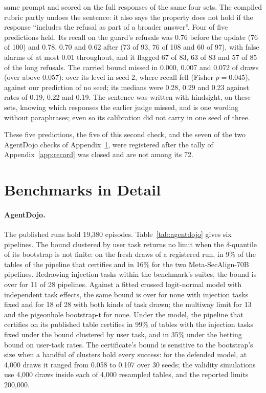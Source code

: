 same prompt and scored on the full responses of the same four sets. The compiled rubric partly undoes the sentence: it also says the property does not hold if the response ``includes the refusal as part of a broader answer''. Four of five predictions held. Its recall on the
guard's refusals was 0.76 before the update (76 of 100) and 0.78, 0.70 and 0.62 after (73 of 93, 76 of 108 and 60 of 97),
with false alarms of at most 0.01 throughout, and it flagged 67 of 83, 63 of 83 and 57 of 85 of the long refusals. The
carried bound missed in 0.000, 0.007 and 0.072 of draws (over above 0.057): over its level in seed 2, where recall fell (Fisher $p=0.045$),
against our prediction of no seed; its medians were 0.28, 0.29 and 0.23 against rates of 0.19, 0.22 and 0.19. The sentence was written with hindsight, on these sets, knowing which responses the
earlier judge missed, and is one wording without paraphrases; even so its calibration did not carry in one seed of three.

These five predictions, the five of this second check,
and the seven of the two AgentDojo checks of Appendix~\ref{app:bench}, were registered after the tally of
Appendix~\ref{app:record} was closed and are not among its 72.

\section{Benchmarks in Detail}
\label{app:bench}

\paragraph{AgentDojo.} The published runs hold 19,380 episodes. Table~\ref{tab:agentdojo} gives six pipelines. The
bound clustered by user task returns no limit when the $\delta$-quantile of its bootstrap is not finite: on the fresh
draws of a registered run, in 9\% of the tables of the pipeline that certifies and in 16\% for the two Meta-SecAlign-70B
pipelines. Redrawing injection tasks within the benchmark's suites, the bound is over for 11 of 28 pipelines. Against
a fitted crossed logit-normal model with independent task effects, the same bound is over for none with injection
tasks fixed and for 18 of 28 with both kinds of task drawn; the multiway limit for 13 and the pigeonhole bootstrap-t for
none. Under the model, the pipeline that certifies on its published table certifies in 99\% of tables with the injection
tasks fixed under the bound clustered by user task, and in 35\% under the betting bound on user-task rates. The
certificate's bound is sensitive to the bootstrap's size when a handful of clusters hold every success: for the
defended model, at 4,000 draws it ranged from 0.058 to 0.107 over 30 seeds; the validity simulations use 4,000 draws inside each of 4,000 resampled tables, and the reported limits 200,000.

